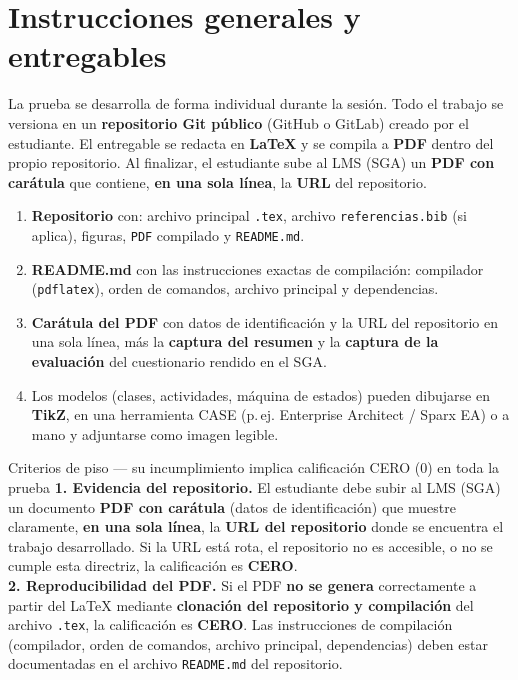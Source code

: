 \documentclass[11pt,a4paper,oneside]{article}
\begin{document}
\section{Instrucciones generales y entregables}

La prueba se desarrolla de forma individual durante la sesi\'on. Todo el trabajo se versiona en un \textbf{repositorio Git p\'ublico} (GitHub o GitLab) creado por el estudiante. El entregable se redacta en \textbf{LaTeX} y se compila a \textbf{PDF} dentro del propio repositorio. Al finalizar, el estudiante sube al LMS (SGA) un \textbf{PDF con car\'atula} que contiene, \textbf{en una sola l\'inea}, la \textbf{URL} del repositorio.

\begin{enumerate}[leftmargin=1.4em,itemsep=1pt,topsep=2pt]
	\item \textbf{Repositorio} con: archivo principal \texttt{.tex}, archivo \texttt{referencias.bib} (si aplica), figuras, \texttt{PDF} compilado y \texttt{README.md}.
	\item \textbf{README.md} con las instrucciones exactas de compilaci\'on: compilador (\texttt{pdflatex}), orden de comandos, archivo principal y dependencias.
	\item \textbf{Car\'atula del PDF} con datos de identificaci\'on y la URL del repositorio en una sola l\'inea, m\'as la \textbf{captura del resumen} y la \textbf{captura de la evaluaci\'on} del cuestionario rendido en el SGA.
	\item Los modelos (clases, actividades, m\'aquina de estados) pueden dibujarse en \textbf{TikZ}, en una herramienta CASE (p.\,ej. Enterprise Architect / Sparx EA) o a mano y adjuntarse como imagen legible.
\end{enumerate}

\begin{piso}{Criterios de piso --- su incumplimiento implica calificaci\'on CERO (0) en toda la prueba}
\textbf{1. Evidencia del repositorio.} El estudiante debe subir al LMS (SGA) un documento \textbf{PDF con car\'atula} (datos de identificaci\'on) que muestre claramente, \textbf{en una sola l\'inea}, la \textbf{URL del repositorio} donde se encuentra el trabajo desarrollado. Si la URL est\'a rota, el repositorio no es accesible, o no se cumple esta directriz, la calificaci\'on es \textbf{CERO}.\\[3pt]
\textbf{2. Reproducibilidad del PDF.} Si el PDF \textbf{no se genera} correctamente a partir del LaTeX mediante \textbf{clonaci\'on del repositorio y compilaci\'on} del archivo \texttt{.tex}, la calificaci\'on es \textbf{CERO}. Las instrucciones de compilaci\'on (compilador, orden de comandos, archivo principal, dependencias) deben estar documentadas en el archivo \texttt{README.md} del repositorio.
\end{piso}
\end{document}
